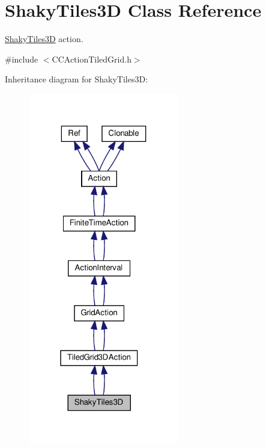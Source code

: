 \hypertarget{classShakyTiles3D}{}\section{Shaky\+Tiles3D Class Reference}
\label{classShakyTiles3D}


\hyperlink{classShakyTiles3D}{Shaky\+Tiles3D} action.  




{\ttfamily \#include $<$C\+C\+Action\+Tiled\+Grid.\+h$>$}



Inheritance diagram for Shaky\+Tiles3D\+:
\nopagebreak
\begin{figure}[H]
\begin{center}
\leavevmode
\includegraphics[width=187pt]{classShakyTiles3D__inherit__graph}
\end{center}
\end{figure}



